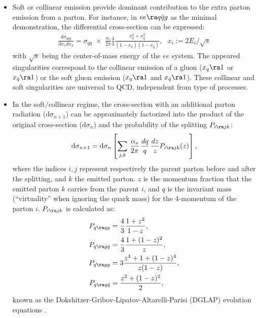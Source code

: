 \begin{itemize}
\item Soft or collinear emission provide dominant contribution to the extra parton emission from a parton.
For instance, in $ee \ra q\bar{q} g$ as the minimal demonstration, the differential cross-section can be expressed:
\begin{align}
\frac{d\sigma_{q\bar{q}g}}{dx_1 dx_2} = \sigma_{q\bar{q}} \,\, \times \,\, \frac{\alpha_s}{2\pi} \frac{4}{3} \frac{x_q^2+x_{\bar{q}}^2}{(1-x_q)(1-x_{\bar{q}})}, \,\,\,\, x_i := 2E_i/\sqrt{s}
\end{align}
with $\sqrt{s}$ being the center-of-mass energy of the $ee$ system.
The appeared singularities correspond to the collinear emission of a gluon ($x_q \ra 1$ or $x_{\bar{q}} \ra 1$) or the soft gluon emission ($x_q \ra 1$ and $x_{\bar{q}} \ra 1$).
These collinear and soft singularities are universal to QCD, independent from type of processes. \\

\item In the soft/collinear regime, the cross-section with an additional parton radiation ($\mathrm{d}\sigma_{n+1}$) can be approximately factorized into the product of the original cross-section ($\mathrm{d}\sigma_{n}$) and the probability of the splitting $P_{i \ra j k}$:
\begin{align}
\mathrm{d}\sigma_{n+1} = \mathrm{d}\sigma_n \left[ \sum_{j,k} \,  \frac{\alpha_s}{2\pi} \, \frac{dq}{q} \, \frac{dz}{z} P_{i \ra j k} (z) \right],
\label{eq::PSSplit}
\end{align}
where the indices $i,j$ represent respectively the parent parton before and after the splitting, and $k$ the emitted parton. 
$z$ is the momentum fraction that the emitted parton $k$ carries from the parent $i$, and $q$ is the invariant mass (``virtuality'' when ignoring the quark mass) for the 4-momentum of the parton $i$. $P_{i \ra j k}$ is calculated as:
\begin{align}
P_{q \ra qg} & = \frac{4}{3} \frac{1+z^2}{1-z}, \nn \\
P_{q \ra gq} & = \frac{4}{3} \frac{1+(1-z)^2}{z}, \nn \\
P_{q \ra gg} & = 3 \frac{z^4+1+(1-z)^4}{z(1-z)}, \nn \\
P_{q \ra q\bar{q}} & = \frac{z^2+(1-z)^2}{2},
\label{eq::DEGLAP}
\end{align}
known as the Dokshitzer-Gribov-Lipatov-Altarelli-Parisi (DGLAP) evolution equations \cite{D_DEGLAP, L_DEGLAP, AP_DEGLAP}.
\end{itemize}

